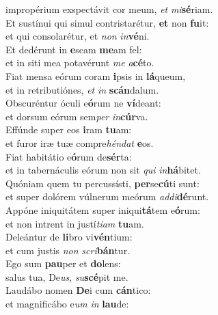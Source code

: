 \evenverse impropérium exspectávit cor meum, \textit{et} \textit{mi}\textbf{sé}riam.\\
\oddverse Et sustínui qui simul contristarétur, \textbf{et} non \textbf{fu}it:~\*\\
\oddverse et qui consolarétur, et \textit{non} \textit{in}\textbf{vé}ni.\\
\evenverse Et dedérunt in \textbf{e}scam \textbf{me}am fel:~\*\\
\evenverse et in siti mea potavérunt \textit{me} \textit{a}\textbf{cé}to.\\
\oddverse Fiat mensa eórum coram \textbf{i}psis in \textbf{lá}queum,~\*\\
\oddverse et in retributiónes, \textit{et} \textit{in} \textbf{scán}dalum.\\
\evenverse Obscuréntur óculi e\textbf{ó}rum ne \textbf{ví}deant:~\*\\
\evenverse et dorsum eórum sem\textit{per} \textit{in}\textbf{cúr}va.\\
\oddverse Effúnde super eos \textbf{i}ram \textbf{tu}am:~\*\\
\oddverse et furor iræ tuæ compre\textit{hén}\textit{dat} \textbf{e}os.\\
\evenverse Fiat habitátio e\textbf{ó}rum de\textbf{sér}ta:~\*\\
\evenverse et in tabernáculis eórum non sit \textit{qui} \textit{in}\textbf{há}bitet.\\
\oddverse Quóniam quem tu percussísti, \textbf{per}se\textbf{cú}ti sunt:~\*\\
\oddverse et super dolórem vúlnerum meórum \textit{ad}\textit{di}\textbf{dé}runt.\\
\evenverse Appóne iniquitátem super iniqui\textbf{tá}tem e\textbf{ó}rum:~\*\\
\evenverse et non intrent in justí\textit{ti}\textit{am} \textbf{tu}am.\\
\oddverse Deleántur de \textbf{li}bro vi\textbf{vén}tium:~\*\\
\oddverse et cum justis \textit{non} \textit{scri}\textbf{bán}tur.\\
\evenverse Ego sum \textbf{pau}per et \textbf{do}lens:~\*\\
\evenverse salus tua, De\textit{us}, \textit{su}\textbf{scé}pit me.\\
\oddverse Laudábo nomen \textbf{De}i cum \textbf{cán}tico:~\*\\
\oddverse et magnificábo e\textit{um} \textit{in} \textbf{lau}de:\\
